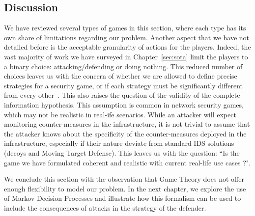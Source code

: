 \subsection{Discussion}
We have reviewed several types of games in this section, where each type has its own share of limitations regarding our problem. Another aspect that we have not detailed before is the acceptable granularity of actions for the players. Indeed, the vast majority of work we have surveyed in Chapter~\ref{sec:sota} limit the players to a binary choice: attacking/defending or doing nothing. This reduced number of choices leaves us with the concern of whether we are allowed to define precise strategies for a security game, or if each strategy must be significantly different from every other~\cite{Kiennert2018}. 
This also raises the question of the validity of the complete information hypothesis.
This assumption is common in network security games, which may not be realistic in real-ife scenarios.
While an attacker will expect monitoring counter-measures in the infrastructure, it is not trivial to assume that the attacker knows about the specificity of the counter-measures deployed in the infrastructure, especially if their nature deviate from standard IDS solutions (\eg decoys and Moving Target Defense).
This leaves us with the question: ``Is the game we have formulated coherent and realistic with current real-life use cases ?". 

We conclude this section with the observation that Game Theory does not offer enough flexibility to model our problem. In the next chapter, we explore the use of Markov Decision Processes and illustrate how this formalism can be used to include the consequences of attacks in the strategy of the defender.



